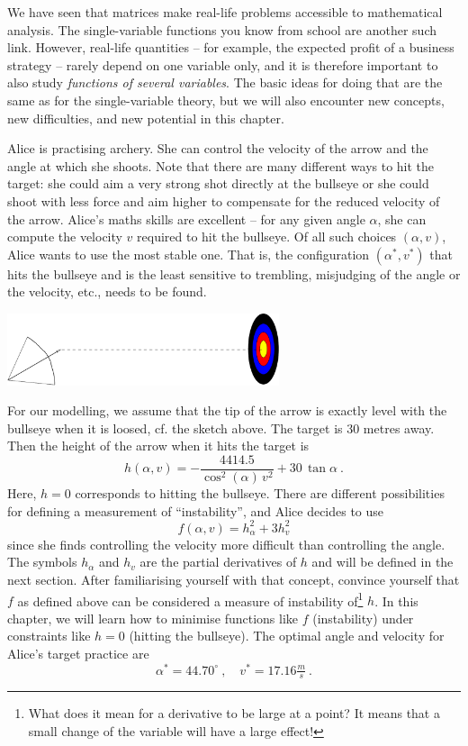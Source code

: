 We have seen that matrices make real-life problems accessible to mathematical analysis. The single-variable functions you know from school are another such link. However, real-life quantities -- for example, the expected profit of a business strategy -- rarely depend on one variable only, and it is therefore important to also study \emph{functions of several variables}. The basic ideas for doing that are the same as for the single-variable theory, but we will also encounter new concepts, new difficulties, and new potential in this chapter.

\begin{application}
Alice is practising archery. She can control the velocity of the arrow and the angle at which she shoots. Note that there are many different ways to hit the target: she could aim a very strong shot directly at the bullseye or she could shoot with less force and aim higher to compensate for the reduced velocity of the arrow. Alice's maths skills are excellent -- for any given angle $\alpha$, she can compute the velocity $v$ required to hit the bullseye. Of all such choices $(\alpha,v)$, Alice wants to use the most stable one. That is, the configuration $(\alpha^*,v^*)$ that hits the bullseye and is the least sensitive to trembling, misjudging of the angle or the velocity, etc., needs to be found.
\begin{center}
	\includegraphics[width=0.6\textwidth]{./Figures/target.pdf}
\end{center}
\end{application}

For our modelling, we assume that the tip of the arrow is exactly level with the bullseye when it is loosed, cf. the sketch above. The target is 30 metres away. Then the height of the arrow when it hits the target is
\[h(\alpha,v) = -\frac{4414.5}{\cos^2(\alpha) \, v^2} + 30 \, \tan\alpha \:. \]
Here, $h=0$ corresponds to hitting the bullseye. There are different possibilities for defining a measurement of ``instability'', and Alice decides to use 
\[ f(\alpha,v) = h_{\alpha}^2 + 3 h_v^2 \]
since she finds controlling the velocity more difficult than controlling the angle. The symbols $h_\alpha$ and $h_v$ are the partial derivatives of $h$ and will be defined in the next section. After familiarising yourself with that concept, convince yourself that $f$ as defined above can be considered a measure of instability of\footnote{What does it mean for a derivative to be large at a point? It means that a small change of the variable will have a large effect!} $h$. In this chapter, we will learn how to minimise functions like $f$ (instability) under constraints like $h=0$ (hitting the bullseye). The optimal angle and velocity for Alice's target practice are
\[\alpha^* = 44.70^{\circ} \:,\quad v^* = 17.16 \tfrac{m}{s} \:. \]

